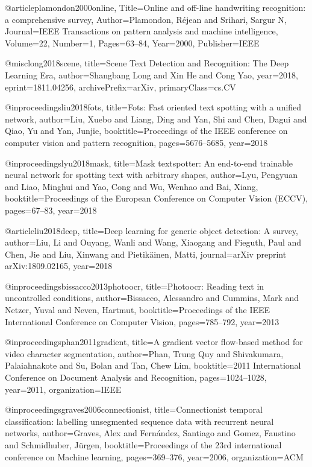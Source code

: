 @article{plamondon2000online,
	Title={Online and off-line handwriting recognition: a comprehensive survey},
	Author={Plamondon, R{\'e}jean and Srihari, Sargur N},
	Journal={IEEE Transactions on pattern analysis and machine intelligence},
	Volume={22},
	Number={1},
	Pages={63--84},
	Year={2000},
	Publisher={IEEE}
}

@misc{long2018scene,
    title={Scene Text Detection and Recognition: The Deep Learning Era},
    author={Shangbang Long and Xin He and Cong Yao},
    year={2018},
    eprint={1811.04256},
    archivePrefix={arXiv},
    primaryClass={cs.CV}
}

@inproceedings{liu2018fots,
  title={Fots: Fast oriented text spotting with a unified network},
  author={Liu, Xuebo and Liang, Ding and Yan, Shi and Chen, Dagui and Qiao, Yu and Yan, Junjie},
  booktitle={Proceedings of the IEEE conference on computer vision and pattern recognition},
  pages={5676--5685},
  year={2018}
}

@inproceedings{lyu2018mask,
  title={Mask textspotter: An end-to-end trainable neural network for spotting text with arbitrary shapes},
  author={Lyu, Pengyuan and Liao, Minghui and Yao, Cong and Wu, Wenhao and Bai, Xiang},
  booktitle={Proceedings of the European Conference on Computer Vision (ECCV)},
  pages={67--83},
  year={2018}
}

@article{liu2018deep,
  title={Deep learning for generic object detection: A survey},
  author={Liu, Li and Ouyang, Wanli and Wang, Xiaogang and Fieguth, Paul and Chen, Jie and Liu, Xinwang and Pietik{\"a}inen, Matti},
  journal={arXiv preprint arXiv:1809.02165},
  year={2018}
}

@inproceedings{bissacco2013photoocr,
  title={Photoocr: Reading text in uncontrolled conditions},
  author={Bissacco, Alessandro and Cummins, Mark and Netzer, Yuval and Neven, Hartmut},
  booktitle={Proceedings of the IEEE International Conference on Computer Vision},
  pages={785--792},
  year={2013}
}

@inproceedings{phan2011gradient,
  title={A gradient vector flow-based method for video character segmentation},
  author={Phan, Trung Quy and Shivakumara, Palaiahnakote and Su, Bolan and Tan, Chew Lim},
  booktitle={2011 International Conference on Document Analysis and Recognition},
  pages={1024--1028},
  year={2011},
  organization={IEEE}
}

@inproceedings{graves2006connectionist,
  title={Connectionist temporal classification: labelling unsegmented sequence data with recurrent neural networks},
  author={Graves, Alex and Fern{\'a}ndez, Santiago and Gomez, Faustino and Schmidhuber, J{\"u}rgen},
  booktitle={Proceedings of the 23rd international conference on Machine learning},
  pages={369--376},
  year={2006},
  organization={ACM}
}


